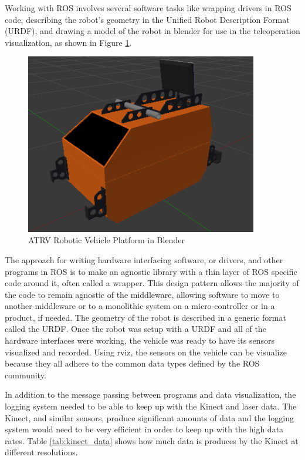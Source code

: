 \documentclass[12pt]{report}
\begin{document}
Working with ROS involves several software tasks like wrapping drivers in ROS code, describing the robot's geometry in the Unified Robot Description Format (URDF), and drawing a model of the robot in blender for use in the teleoperation visualization, as shown in Figure \ref{fig:atrv_blender}.

\begin{figure}[ht]
  \centering
  \includegraphics[width=4in,keepaspectratio]{atrv_blender.png}
  \caption{ATRV Robotic Vehicle Platform in Blender}
  \label{fig:atrv_blender}
\end{figure}

The approach for writing hardware interfacing software, or drivers, and other programs in ROS is to make an agnostic library with a thin layer of ROS specific code around it, often called a wrapper.  This design pattern allows the majority of the code to remain agnostic of the middleware, allowing software to move to another middleware or to a monolithic system on a micro-controller or in a product, if needed.  The geometry of the robot is described in a generic format called the URDF.  Once the robot was setup with a URDF and all of the hardware interfaces were working, the vehicle was ready to have its sensors visualized and recorded.  Using rviz, the sensors on the vehicle can be visualize because they all adhere to the common data types defined by the ROS community.  

In addition to the message passing between programs and data visualization, the logging system needed to be able to keep up with the Kinect and laser data.  The Kinect, and similar sensors, produce significant amounts of data and the logging system would need to be very efficient in order to keep up with the high data rates.  Table \ref{tab:kinect_data} shows how much data is produces by the Kinect at different resolutions.
\end{document}
